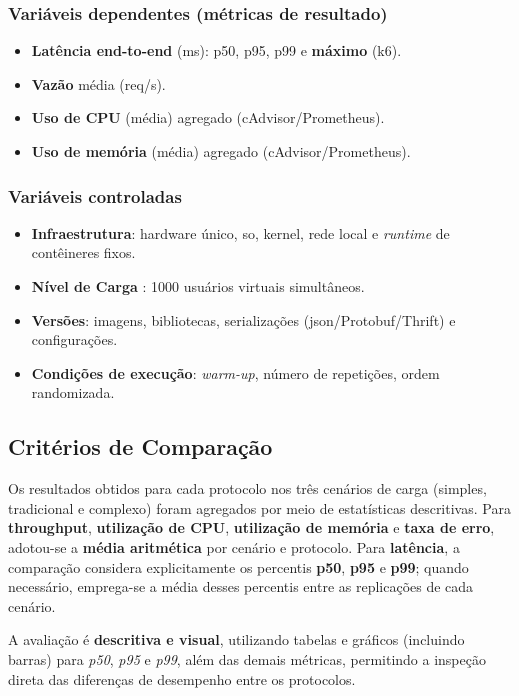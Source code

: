 \subsubsection*{Variáveis dependentes (métricas de resultado)}
\begin{itemize}
\item \textbf{Latência end-to-end} (ms): p50, p95, p99 e \textbf{máximo} (k6).
\item \textbf{Vazão} média (req/s).
\item \textbf{Uso de CPU} (média) agregado (cAdvisor/Prometheus).
\item \textbf{Uso de memória} (média) agregado (cAdvisor/Prometheus).
\end{itemize}

\subsubsection*{Variáveis controladas}
\begin{itemize}
\item \textbf{Infraestrutura}: hardware único, \acrshort{so}, kernel, rede local e \textit{runtime} de contêineres fixos.
\item \textbf{Nível de Carga} : {1000 usuários virtuais simultâneos}.
\item \textbf{Versões}: imagens, bibliotecas, serializações (\acrshort{json}/Protobuf/Thrift) e configurações.
\item \textbf{Condições de execução}: \textit{warm-up}, número de repetições, ordem randomizada.
\end{itemize}

\subsection{Critérios de Comparação}

Os resultados obtidos para cada protocolo nos três cenários de carga (simples, tradicional e complexo) foram agregados por meio de estatísticas descritivas. Para \textbf{throughput}, \textbf{utilização de CPU}, \textbf{utilização de memória} e \textbf{taxa de erro}, adotou-se a \textbf{média aritmética} por cenário e protocolo. Para \textbf{latência}, a comparação considera explicitamente os percentis \textbf{p50}, \textbf{p95} e \textbf{p99}; quando necessário, emprega-se a média desses percentis entre as replicações de cada cenário.

A avaliação é \textbf{descritiva e visual}, utilizando tabelas e gráficos (incluindo barras) para \textit{p50}, \textit{p95} e \textit{p99}, além das demais métricas, permitindo a inspeção direta das diferenças de desempenho entre os protocolos.


